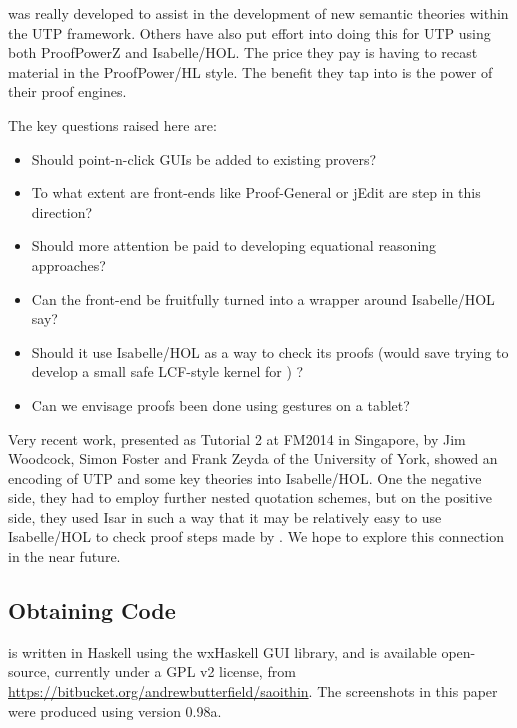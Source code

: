 \documentclass[copyright]{eptcs}
\begin{document}
 was really developed to assist in the development of new semantic theories
within the UTP framework. Others have also put effort into doing this for UTP
using both ProofPowerZ\cite{conf/utp/ZC08}
and Isabelle/HOL\cite{conf/vstte/FeliachiGW12,conf/utp/FZW14}.
The price they pay is having to recast material in the ProofPower/HL style.
The benefit they tap into is the power of their proof engines.

The key questions raised here are:
\begin{itemize}
  \item Should point-n-click GUIs be added to existing provers?
  \item To what extent are front-ends like Proof-General or jEdit
  are step in this direction?
  \item
    Should more attention be paid to developing equational reasoning approaches?
  \item
  Can the  front-end be fruitfully turned into a wrapper around Isabelle/HOL say?
  \item
  Should it use Isabelle/HOL as a way to check its proofs
  (would save trying to develop a small safe LCF-style kernel for ) ?
  \item
   Can we envisage proofs been done using gestures on a tablet?
\end{itemize}
Very recent work, presented as Tutorial 2 at FM2014 in Singapore, by Jim Woodcock, Simon Foster
and Frank Zeyda of the University of York, showed an encoding of UTP and some key theories
into Isabelle/HOL. One the negative side, they had to employ further nested quotation schemes,
but on the positive side, they used Isar in such a way that it may be relatively easy to use
Isabelle/HOL to check proof steps made by . We hope to explore this connection in the near future.

\subsection{Obtaining Code}

 is written in Haskell using the wxHaskell GUI library,
and is available open-source, currently under a GPL v2 license,
from \url{https://bitbucket.org/andrewbutterfield/saoithin}.
The screenshots in this paper were produced using version 0.98a.




\appendix

%

%
%
%
%
%
%
%
\end{document}
